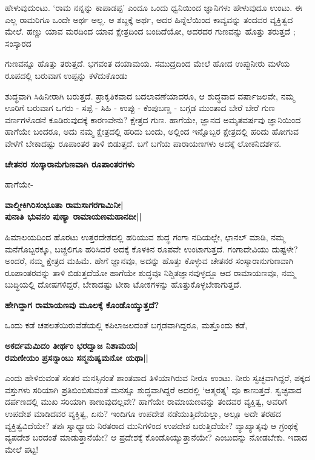 ಹೇಳುವುದುಂಟು. `ರಾಮ ನನ್ನನ್ನು ಕಾಪಾಡಪ್ಪ' ಎಂದೂ ಒಂದು ಧ್ವನಿಯಿಂದ ಜ್ಞಾನಿಗಳು ಹೇಳುವುದೂ ಉಂಟು. ಈ ಎಲ್ಲ ರಾಮರಿಗೂ ಒಂದೇ ಅರ್ಥ ಅಲ್ಲ. ಆ ಶಬ್ದಕ್ಕೆ ಅರ್ಥ, ಅದರ ಹಿನ್ನೆಲೆಯಿಂದ ಕಾವ್ಯವನ್ನು ತಂದವರ ವ್ಯಕ್ತಿತ್ವದ ಮೇಲೆ. ಹಣ್ಣು ಯಾವ ಮರದಿಂದ ಯಾವ ಕ್ಷೇತ್ರದಿಂದ ಬಂದಿದೆಯೋ, ಅದರದರ ಗುಣವನ್ನು ಹೊತ್ತು ತರುತ್ತದೆ ; ಸಂಸ್ಕಾರದ 

ಗುಣವನ್ನೂ ಹೊತ್ತು ತರುತ್ತದೆ. ಭಗವಂತ ದಯಾಮಯ. ಸಮುದ್ರದಿಂದ ಮೇಲೆ ಹೋದ ಉಪ್ಪುನೀರು ಮಳೆಯ ರೂಪದಲ್ಲಿ ಬರುವಾಗ ಉಪ್ಪನ್ನು ಕಳೆದುಕೊಂಡು 

ಶುದ್ಧವಾಗಿ ಸಿಹಿನೀರಾಗಿ ಬರುತ್ತದೆ. ಪ್ರಾಕೃತಿಕವಾದ ಬದಲಾವಣೆಯಾದರೂ, ಆ ಶುದ್ಧವಾದ ವರ್ಷಾಜಲವೇ, ನಮ್ಮ ಊರಿಗೆ ಬರುವಾಗ ಒಗರು - ಸಪ್ಪೆ - ಸಿಹಿ - ಉಪ್ಪು - ಕೆಂಪುಬಣ್ಣ - ಬಗ್ಗಡ ಮುಂತಾದ ಬೇರೆ ಬೇರೆ ಗುಣ ವರ್ಣಗಳೊಡನೆ ಕೂಡಿರುವುದಕ್ಕೆ ಕಾರಣವೇನು? ಕ್ಷೇತ್ರದ ಗುಣ. ಹಾಗೆಯೇ, ಜ್ಞಾನದ ಅಮೃತವರ್ಷವು ಜ್ಞಾನಿಯಿಂದ ಹಾಗೆಯೇ ಬಂದರೂ, ಅದು ನಮ್ಮ ಕ್ಷೇತ್ರದಲ್ಲಿ ಹರಿದು ಬಂದು, ಅಲ್ಲಿಂದ ಇನ್ನೊಬ್ಬರ ಕ್ಷೇತ್ರದಲ್ಲಿ ಹರಿದು ಹೋಗುವ ವೇಳೆಗೆ ಬೇಕಾದಷ್ಟು ರೂಪಾಂತರ ತಾಳಿ ಬಿಡುತ್ತದೆ. ಬಗೆ ಬಗೆಯ ಪಾರಾಯಣಗಳು ಅದಕ್ಕೆ ಲೋಕನಿದರ್ಶನ. 


{\bf ಚೇತನರ ಸಂಸ್ಕಾರಾನುಗುಣವಾಗಿ ರೂಪಾಂತರಗಳು} 


ಹಾಗೆಯೇ- 


\begin{center} 

{\bf ವಾಲ್ಮೀಕಿಗಿರಿಸಂಭೂತಾ ರಾಮಸಾಗರಗಾಮಿನೀ|\\ 

ಪುನಾತಿ ಭುವನಂ ಪುಣ್ಯಾ ರಾಮಾಯಣಮಹಾನದೀ||} 

\end{center} 


ಹಿಮಾಲಯದಿಂದ ಹೊರಟು ಉತ್ತರದೇಶದಲ್ಲಿ ಹರಿಯುವ ಶುದ್ಧ ಗಂಗಾ ನದಿಯಲ್ಲೇ, ಛಾನಲ್‍ ಮಾಡಿ, ನಮ್ಮ ಮನೆಗೊಬ್ಬರಕ್ಕೂ, ಬಚ್ಚಲಿಗೂ ಹರಿಸಿದರೆ ಅದಕ್ಕೆ ಕೊಳಕಿನ ರೂಪವೇ ಉಂಟಾಗುತ್ತದೆ. ಗಂಗಾದೇವಿಯು ದುಷ್ಟಳೇ? ಅಂದರೆ, ನಮ್ಮ ಕ್ಷೇತ್ರದ ಮಹಿಮೆ. ಹೇಗೆ ಜ್ಞಾನವೂ, ಅದನ್ನು ಹೊತ್ತು ಕೊಳ್ಳುವ ಚೇತನರ ಸಂಸ್ಕಾರಾನುಗುಣವಾಗಿ ರೂಪಾಂತರವನ್ನು ತಾಳಿ ಬಿಡುತ್ತದೆಯೋ ಹಾಗೆಯೇ ಶುದ್ಧವೂ ನಿಶ್ಚಿತಜ್ಞಾನವುಳ್ಳದ್ದೂ ಆದ ರಾಮಾಯಣವೂ, ನಮ್ಮ ಬುದ್ಧಿಯಲ್ಲಿ ದೋಷಗಳಿದ್ದರೆ, ಬೇಕಾದಷ್ಟು ಟೀಕಾ ಟೋಕಗಳನ್ನು ಹೊತ್ತುಕೊಳ್ಳಬೇಕಾಗುತ್ತದೆ. 


{\bf ಹೇಗಿದ್ದಾಗ ರಾಮಾಯಣವು ಮೂಲಕ್ಕೆ ಕೊಂಡೊಯ್ಯುತ್ತದೆ?} 


ಒಂದು ಕಡೆ ಚಪಲತೆಯಿರುವೆಡೆಯಲ್ಲಿ ಕಪಿಲಾಜಲದಂತೆ ಬಗ್ಗಡವಾಗಿದ್ದರೂ, ಮತ್ತೊಂದು ಕಡೆ, 


\begin{center} 

{\bf ಅಕರ್ದಮಮಿದಂ ತೀರ್ಥಂ ಭರದ್ವಾಜ ನಿಶಾಮಯ|\\ 

ರಮಣೀಯಂ ಪ್ರಸನ್ನಾಂಬು ಸನ್ಮನುಷ್ಯಮನೋ ಯಥಾ||} 

\end{center} 


ಎಂದು ಹೇಳಿರುವಂತೆ ಸಂತರ ಮನಸ್ಸಿನಂತೆ ಶಾಂತವಾದ ತಿಳಿಯಾಗಿರುವ ನೀರೂ ಉಂಟು. ನೀರು ಸ್ವಚ್ಛವಾಗಿದ್ದರೆ, ಪಕ್ಕದ ವಸ್ತುಗಳು ಸರಿಯಾಗಿ ಪ್ರತಿಬಿಂಬಿಸುವಂತೆ ಮನಸ್ಸೂ ಶುದ್ಧವಾಗಿದ್ದರೆ ಅದರಲ್ಲಿ `ಆತ್ಮರತ್ನ' ವೂ ಕಾಣುತ್ತದೆ. ಸ್ವಚ್ಛವಾದ ದರ್ಪಣದಲ್ಲಿ ಮುಖ ಸರಿಯಾಗಿ ಕಾಣುವುದಲ್ಲವೇ? ಹಾಗೆಯೇ ರಾಮಾಯಣವನ್ನು ತಂದವರ ವ್ಯಕ್ತಿತ್ವ, ಅವರಿಗೆ ಉಪದೇಶ ಮಾಡಿದವರ ವ್ಯಕ್ತಿತ್ವ, ಏನು? ಇಂದಿಗೂ ಉಪದೇಶ ನಡೆಯುತ್ತಿದೆಯಲ್ಲಾ, ಅಲ್ಲೂ ಅದೇ ತರಹದ ವ್ಯಕ್ತಿತ್ವವಿದೆಯೇ? ತಪಃ ಸ್ವಾಧ್ಯಾಯ ನಿರತರಾದ ಮುನಿಗಳಿಂದ ಉಪದೇಶ ಬರುತ್ತಿದೆಯೇ? ವ್ಯಾಖ್ಯಾತೃವು ಆ ಗ್ರಂಥಕ್ಕೆ ವ್ಯಪದೇಶ ಬರದಂತೆ ಮಾಡುತ್ತಾನೆಯೇ? ಆ ಪ್ರದೇಶಕ್ಕೆ ಕೊಂಡೊಯ್ಯುತ್ತಾನೆಯೇ? ಎಂಬುದನ್ನು ನೋಡಬೇಕು. ಇದಾದ ಮೇಲೆ ಪಟ್ಟ! 


